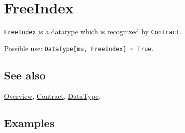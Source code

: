 \documentclass[../FeynCalcManual.tex]{subfiles}
\begin{document}
\hypertarget{freeindex}{
\section{FreeIndex}\label{freeindex}}

\texttt{FreeIndex} is a datatype which is recognized by
\texttt{Contract}.

Possible use:
\texttt{DataType[\allowbreak{}mu,\ \allowbreak{}FreeIndex] = True}.

\subsection{See also}

\hyperlink{toc}{Overview}, \hyperlink{contract}{Contract},
\hyperlink{datatype}{DataType}.

\subsection{Examples}
\end{document}
